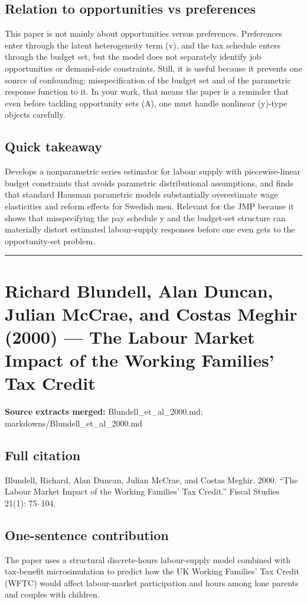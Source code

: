 \documentclass[11pt,a4paper]{article}
\begin{document}
\subsection*{Relation to opportunities vs preferences}
This paper is not mainly about opportunities versus preferences. Preferences enter through the latent heterogeneity term (v), and the tax schedule enters through the budget set, but the model does not separately identify job opportunities or demand-side constraints. Still, it is useful because it prevents one source of confounding: misspecification of the budget set and of the parametric response function to it. In your work, that means the paper is a reminder that even before tackling opportunity sets (A), one must handle nonlinear (y)-type objects carefully.

\subsection*{Quick takeaway}
Develops a nonparametric series estimator for labour supply with piecewise-linear budget constraints that avoids parametric distributional assumptions, and finds that standard Hausman parametric models substantially overestimate wage elasticities and reform effects for Swedish men. Relevant for the JMP because it shows that misspecifying the pay schedule y and the budget-set structure can materially distort estimated labour-supply responses before one even gets to the opportunity-set problem.


\medskip\hrule\medskip

\section*{Richard Blundell, Alan Duncan, Julian McCrae, and Costas Meghir (2000) — The Labour Market Impact of the Working Families’ Tax Credit}

\textbf{Source extracts merged:} Blundell\_et\_al\_2000.md; markdowns/Blundell\_et\_al\_2000.md

\subsection*{Full citation}
Blundell, Richard, Alan Duncan, Julian McCrae, and Costas Meghir. 2000. “The Labour Market Impact of the Working Families’ Tax Credit.” Fiscal Studies 21(1): 75–104.

\subsection*{One-sentence contribution}
The paper uses a structural discrete-hours labour-supply model combined with tax-benefit microsimulation to predict how the UK Working Families’ Tax Credit (WFTC) would affect labour-market participation and hours among lone parents and couples with children.
\end{document}
